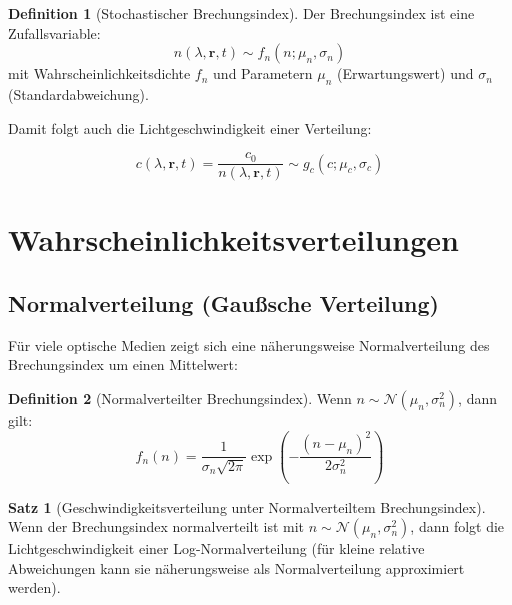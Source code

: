 \documentclass[a4paper,12pt]{article}
\theoremstyle{definition}
\newtheorem{definition}{Definition}[section]
\newtheorem{satz}{Satz}[section]
\theoremstyle{remark}
\newcommand{\cLight}{c}
\newcommand{\refIndex}{n}
\begin{document}
\begin{definition}[Stochastischer Brechungsindex]
Der Brechungsindex ist eine Zufallsvariable:
\begin{equation}
    \refIndex(\lambda, \mathbf{r}, t) \sim f_{\refIndex}(n; \mu_n, \sigma_n)
\end{equation}
mit Wahrscheinlichkeitsdichte $f_{\refIndex}$ und Parametern $\mu_n$ (Erwartungswert) und $\sigma_n$ (Standardabweichung).
\end{definition}

Damit folgt auch die Lichtgeschwindigkeit einer Verteilung:

\begin{equation}
    \cLight(\lambda, \mathbf{r}, t) = \frac{\cLight_0}{\refIndex(\lambda, \mathbf{r}, t)} \sim g_{\cLight}(c; \mu_c, \sigma_c)
\end{equation}

\section{Wahrscheinlichkeitsverteilungen}

\subsection{Normalverteilung (Gaußsche Verteilung)}

Für viele optische Medien zeigt sich eine näherungsweise Normalverteilung des Brechungsindex um einen Mittelwert:

\begin{definition}[Normalverteilter Brechungsindex]
Wenn $\refIndex \sim \mathcal{N}(\mu_n, \sigma_n^2)$, dann gilt:
\begin{equation}
    f_{\refIndex}(n) = \frac{1}{\sigma_n \sqrt{2\pi}} \exp\left(-\frac{(n-\mu_n)^2}{2\sigma_n^2}\right)
\end{equation}
\end{definition}

\begin{satz}[Geschwindigkeitsverteilung unter Normalverteiltem Brechungsindex]
Wenn der Brechungsindex normalverteilt ist mit $\refIndex \sim \mathcal{N}(\mu_n, \sigma_n^2)$, dann folgt die Lichtgeschwindigkeit einer Log-Normalverteilung (für kleine relative Abweichungen kann sie näherungsweise als Normalverteilung approximiert werden).
\end{satz}
\end{document}
